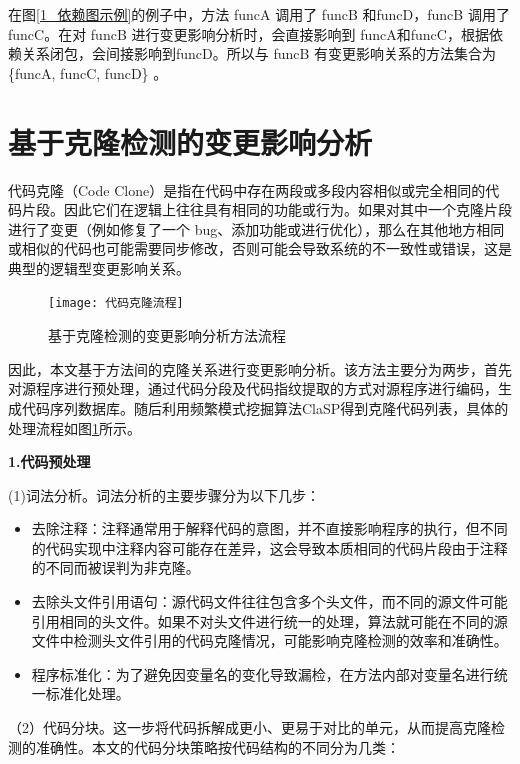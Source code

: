 在图\ref{1_依赖图示例}的例子中，方法 funcA 调用了 funcB 和funcD，funcB 调用了 funcC。在对 funcB 进行变更影响分析时，会直接影响到 funcA和funcC，根据依赖关系闭包，会间接影响到funcD。所以与 funcB 有变更影响关系的方法集合为\{funcA, funcC, funcD\} 。


\section{基于克隆检测的变更影响分析}
代码克隆（Code Clone）是指在代码中存在两段或多段内容相似或完全相同的代码片段。因此它们在逻辑上往往具有相同的功能或行为。如果对其中一个克隆片段进行了变更（例如修复了一个 bug、添加功能或进行优化），那么在其他地方相同或相似的代码也可能需要同步修改，否则可能会导致系统的不一致性或错误，这是典型的逻辑型变更影响关系。

\begin{figure}[htbp]
\centering
\texttt{[image: 代码克隆流程]}
\caption{基于克隆检测的变更影响分析方法流程}
\label{1_基于代码克隆的变更影响分析方法流程}
\end{figure}

因此，本文基于方法间的克隆关系进行变更影响分析。该方法主要分为两步，首先对源程序进行预处理，通过代码分段及代码指纹提取的方式对源程序进行编码，生成代码序列数据库。随后利用频繁模式挖掘算法ClaSP得到克隆代码列表，具体的处理流程如图\ref{1_基于代码克隆的变更影响分析方法流程}所示。


\noindent \textbf{1.代码预处理}

(1)词法分析。词法分析的主要步骤分为以下几步：

\begin{itemize}
    \item 去除注释：注释通常用于解释代码的意图，并不直接影响程序的执行，但不同的代码实现中注释内容可能存在差异，这会导致本质相同的代码片段由于注释的不同而被误判为非克隆。
    
    \item 去除头文件引用语句：源代码文件往往包含多个头文件，而不同的源文件可能引用相同的头文件。如果不对头文件进行统一的处理，算法就可能在不同的源文件中检测头文件引用的代码克隆情况，可能影响克隆检测的效率和准确性。
    
    \item 程序标准化：为了避免因变量名的变化导致漏检，在方法内部对变量名进行统一标准化处理。

\end{itemize}

（2）代码分块。这一步将代码拆解成更小、更易于对比的单元，从而提高克隆检测的准确性。本文的代码分块策略按代码结构的不同分为几类：

